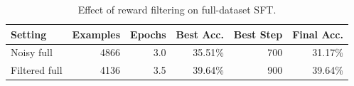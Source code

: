 \begin{table}[h]
\centering
\begin{tabular}{lrrrrr}
\toprule
Setting & Examples & Epochs & Best Acc. & Best Step & Final Acc. \\
\midrule
Noisy full & 4866 & 3.0 & 35.51\% & 700 & 31.17\% \\
Filtered full & 4136 & 3.5 & 39.64\% & 900 & 39.64\% \\
\bottomrule
\end{tabular}
\caption{Effect of reward filtering on full-dataset SFT.}
\label{tab:sft-filtered}
\end{table}
